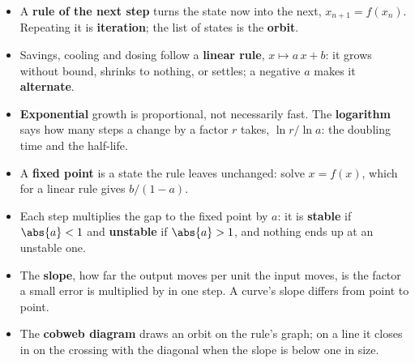 \begin{summarybox}[unbreakable]
\begin{itemize}
\item A \textbf{rule of the next step} turns the state now into the next,
  $x_{n+1} = f(x_n)$. Repeating it is \textbf{iteration}; the list of
  states is the \textbf{orbit}.
\item Savings, cooling and dosing follow a \textbf{linear rule},
  $x \mapsto a\,x + b$: it grows without bound, shrinks to nothing, or
  settles; a negative $a$ makes it \textbf{alternate}.
\item \textbf{Exponential} growth is proportional, not necessarily fast.
  The \textbf{logarithm} says how many steps a change by a factor $r$
  takes, $\ln r / \ln a$: the doubling time and the half-life.
\item A \textbf{fixed point} is a state the rule leaves unchanged: solve
  $x = f(x)$, which for a linear rule gives $b/(1 - a)$.
\item Each step multiplies the gap to the fixed point by $a$: it is
  \textbf{stable} if $\abs{a} < 1$ and \textbf{unstable} if $\abs{a} > 1$,
  and nothing ends up at an unstable one.
\item The \textbf{slope}, how far the output moves per unit the input
  moves, is the factor a small error is multiplied by in one step. A
  curve's slope differs from point to point.
\item The \textbf{cobweb diagram} draws an orbit on the rule's graph; on a
  line it closes in on the crossing with the diagonal when the slope is
  below one in size.
\end{itemize}
\end{summarybox}

\canyou

